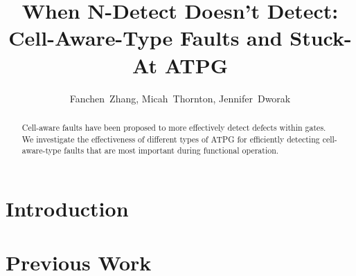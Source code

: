 \documentclass[10 pt, technote]{IEEEtran}
\title{When N-Detect Doesn't Detect: Cell-Aware-Type Faults and Stuck-At ATPG}
\author{Fanchen~Zhang, Micah~Thornton, Jennifer~Dworak}
\begin{document}
\twocolumn[
  \begin{@twocolumnfalse}
    \maketitle
  \end{@twocolumnfalse}
]

\begin{abstract}

Cell-aware faults have been proposed to more effectively detect defects within gates.  We investigate the effectiveness of different types of ATPG for efficiently detecting cell-aware-type faults that are most important during functional operation.

\end{abstract}

\tableofcontents

\section{Introduction}

\section{Previous Work}

	
\end{document}
